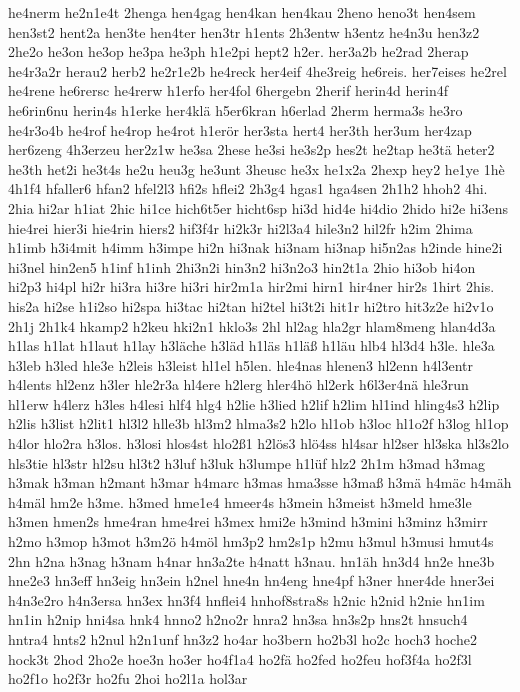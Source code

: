 {he4nerm
he2n1e4t
2henga
hen4gag
hen4kan
hen4kau
2heno
heno3t
hen4sem
hen3st2
hent2a
hen3te
hen4ter
hen3tr
h1ents
2h3entw
h3entz
he4n3u
hen3z2
2he2o
he3on
he3op
he3pa
he3ph
h1e2pi
hept2
h2er.
her3a2b
he2rad
2herap
he4r3a2r
herau2
herb2
he2r1e2b
he4reck
her4eif
4he3reig
he6reis.
her7eises
he2rel
he4rene
he6rersc
he4rerw
h1erfo
her4fol
6hergebn
2herif
herin4d
herin4f
he6rin6nu
herin4s
h1erke
her4klä
h5er6kran
h6erlad
2herm
herma3s
he3ro
he4r3o4b
he4rof
he4rop
he4rot
h1erör
her3sta
hert4
her3th
her3um
her4zap
her6zeng
4h3erzeu
her2z1w
he3sa
2hese
he3si
he3s2p
hes2t
he2tap
he3tä
heter2
he3th
het2i
he3t4s
he2u
heu3g
he3unt
3heusc
he3x
he1x2a
2hexp
hey2
he1ye
1hè
4h1f4
hfaller6
hfan2
hfel2l3
hfi2s
hflei2
2h3g4
hgas1
hga4sen
2h1h2
hhoh2
4hi.
2hia
hi2ar
h1iat
2hic
hi1ce
hich6t5er
hicht6sp
hi3d
hid4e
hi4dio
2hido
hi2e
hi3ens
hie4rei
hier3i
hie4rin
hiers2
hif3f4r
hi2k3r
hi2l3a4
hile3n2
hil2fr
h2im
2hima
h1imb
h3i4mit
h4imm
h3impe
hi2n
hi3nak
hi3nam
hi3nap
hi5n2as
h2inde
hine2i
hi3nel
hin2en5
h1inf
h1inh
2hi3n2i
hin3n2
hi3n2o3
hin2t1a
2hio
hi3ob
hi4on
hi2p3
hi4pl
hi2r
hi3ra
hi3re
hi3ri
hir2m1a
hir2mi
hirn1
hir4ner
hir2s
1hirt
2his.
his2a
hi2se
h1i2so
hi2spa
hi3tac
hi2tan
hi2tel
hi3t2i
hit1r
hi2tro
hit3z2e
hi2v1o
2h1j
2h1k4
hkamp2
h2keu
hki2n1
hklo3s
2hl
hl2ag
hla2gr
hlam8meng
hlan4d3a
h1las
h1lat
h1laut
h1lay
h3läche
h3läd
h1läs
h1läß
h1läu
hlb4
hl3d4
h3le.
hle3a
h3leb
h3led
hle3e
h2leis
h3leist
hl1el
h5len.
hle4nas
hlenen3
hl2enn
h4l3entr
h4lents
hl2enz
h3ler
hle2r3a
hl4ere
h2lerg
hler4hö
hl2erk
h6l3er4nä
hle3run
hl1erw
h4lerz
h3les
h4lesi
hlf4
hlg4
h2lie
h3lied
h2lif
h2lim
hl1ind
hling4s3
h2lip
h2lis
h3list
h2lit1
hl3l2
hlle3b
hl3m2
hlma3s2
h2lo
hl1ob
h3loc
hl1o2f
h3log
hl1op
h4lor
hlo2ra
h3los.
h3losi
hlos4st
hlo2ß1
h2lös3
hlö4ss
hl4sar
hl2ser
hl3ska
hl3s2lo
hls3tie
hl3str
hl2su
hl3t2
h3luf
h3luk
h3lumpe
h1lüf
hlz2
2h1m
h3mad
h3mag
h3mak
h3man
h2mant
h3mar
h4marc
h3mas
hma3sse
h3maß
h3mä
h4mäc
h4mäh
h4mäl
hm2e
h3me.
h3med
hme1e4
hmeer4s
h3mein
h3meist
h3meld
hme3le
h3men
hmen2s
hme4ran
hme4rei
h3mex
hmi2e
h3mind
h3mini
h3minz
h3mirr
h2mo
h3mop
h3mot
h3m2ö
h4möl
hm3p2
hm2s1p
h2mu
h3mul
h3musi
hmut4s
2hn
h2na
h3nag
h3nam
h4nar
hn3a2te
h4natt
h3nau.
hn1äh
hn3d4
hn2e
hne3b
hne2e3
hn3eff
hn3eig
hn3ein
h2nel
hne4n
hn4eng
hne4pf
h3ner
hner4de
hner3ei
h4n3e2ro
h4n3ersa
hn3ex
hn3f4
hnflei4
hnhof8stra8s
h2nic
h2nid
h2nie
hn1im
hn1in
h2nip
hni4sa
hnk4
hnno2
h2no2r
hnra2
hn3sa
hn3s2p
hns2t
hnsuch4
hntra4
hnts2
h2nul
h2n1unf
hn3z2
ho4ar
ho3bern
ho2b3l
ho2c
hoch3
hoche2
hock3t
2hod
2ho2e
hoe3n
ho3er
ho4f1a4
ho2fä
ho2fed
ho2feu
hof3f4a
ho2f3l
ho2f1o
ho2f3r
ho2fu
2hoi
ho2l1a
hol3ar
}
